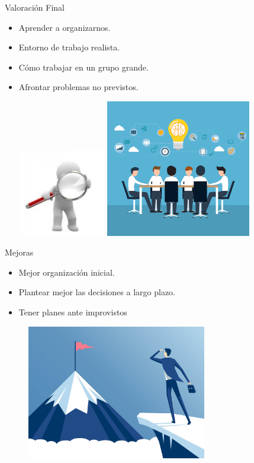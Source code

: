 \documentclass{beamer}
\begin{document}
\begin{frame}{Valoraci\'on Final}
	\begin{itemize}
 	 \item {
  		Aprender a organizarnos.
 	 }
 	 \item {
  		Entorno de trabajo realista.
 	 }
 	 \item {
		C\'omo trabajar en un grupo grande.
 	 }
 	 \item {
  		Afrontar problemas no previstos.
 	 }
 	 
	\includegraphics[width=0.3\textwidth, height=0.5\textheight]{images_latex/valoracion}
		\includegraphics[width=0.5\textwidth, height=0.45\textheight]{images_latex/trabajoequipo}
  \end{itemize}
\end{frame}

\begin{frame}{Mejoras}
	\begin{itemize}
 	 \item {
  		Mejor organización inicial.
 	 }
 	 \item {
  		Plantear mejor las decisiones a largo plazo.
 	 }
 	 \item {
		Tener planes ante improvistos
 	 }
 	
  \end{itemize}
  	\begin{figure}[H]
  		\includegraphics[width=0.7\textwidth, height=0.5\textheight]{images_latex/largoplazo}
  	\end{figure}
\end{frame}
\end{document}
